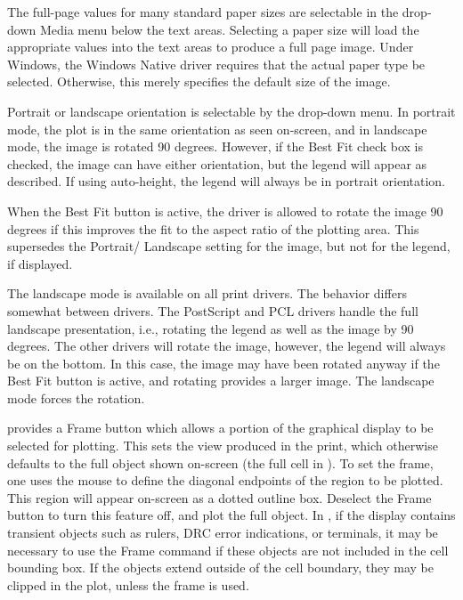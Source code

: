 The full-page values for many standard paper sizes are selectable in
the drop-down {\cb Media} menu below the text areas.  Selecting a
paper size will load the appropriate values into the text areas to
produce a full page image.  Under Windows, the {\et Windows Native}
driver requires that the actual paper type be selected.  Otherwise,
this merely specifies the default size of the image.

Portrait or landscape orientation is selectable by the drop-down menu. 
In portrait mode, the plot is in the same orientation as seen
on-screen, and in landscape mode, the image is rotated 90 degrees. 
However, if the {\cb Best Fit} check box is checked, the image can
have either orientation, but the legend will appear as described.  If
using auto-height, the legend will always be in portrait orientation.

When the {\cb Best Fit} button is active, the driver is allowed to
rotate the image 90 degrees if this improves the fit to the aspect
ratio of the plotting area.  This supersedes the {\cb Portrait}/{\cb
Landscape} setting for the image, but not for the legend, if
displayed.

The landscape mode is available on all print drivers.  The behavior
differs somewhat between drivers.  The PostScript and PCL drivers
handle the full landscape presentation, i.e., rotating the legend as
well as the image by 90 degrees.  The other drivers will rotate the
image, however, the legend will always be on the bottom.  In this
case, the image may have been rotated anyway if the {\cb Best Fit}
button is active, and rotating provides a larger image.  The landscape
mode forces the rotation.

{\Xic} provides a {\cb Frame} button which allows a portion of the
graphical display to be selected for plotting.  This sets the view
produced in the print, which otherwise defaults to the full object
shown on-screen (the full cell in {\Xic}).  To set the frame, one uses
the mouse to define the diagonal endpoints of the region to be
plotted.  This region will appear on-screen as a dotted outline box. 
Deselect the {\cb Frame} button to turn this feature off, and plot the
full object.  In {\Xic}, if the display contains transient objects
such as rulers, DRC error indications, or terminals, it may be
necessary to use the {\cb Frame} command if these objects are not
included in the cell bounding box.  If the objects extend outside of
the cell boundary, they may be clipped in the plot, unless the frame
is used.

